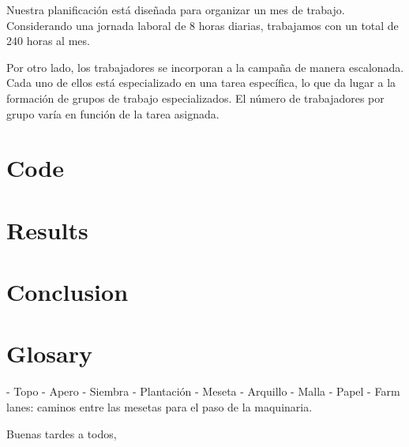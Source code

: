 Nuestra planificación está diseñada para organizar un mes de trabajo. Considerando una jornada laboral de 8 horas diarias, 
trabajamos con un total de 240 horas al mes.

Por otro lado, los trabajadores se incorporan a la campaña de manera escalonada. Cada uno de ellos está especializado en una 
tarea específica, lo que da lugar a la formación de grupos de trabajo especializados. El número de trabajadores por grupo varía 
en función de la tarea asignada.



\chapter*{Code}

\chapter*{Results}

\chapter*{Conclusion}

\newpage
\appendix
\chapter*{Glosary}


- Topo
- Apero
- Siembra
- Plantación
- Meseta
- Arquillo
- Malla
- Papel
- Farm lanes: caminos entre las mesetas para el paso de la maquinaria.





Buenas tardes a todos, 

